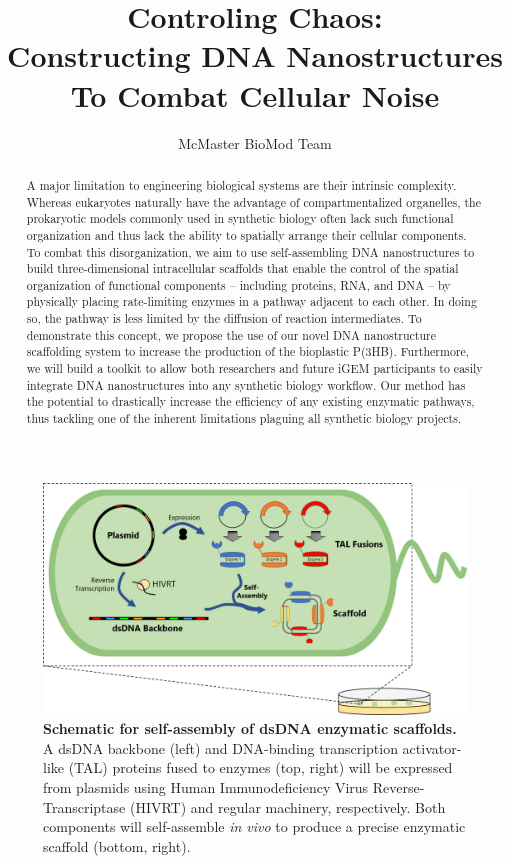 \documentclass[a4paper]{article}
\title{Controling Chaos: \\ Constructing DNA Nanostructures To Combat Cellular Noise}
\author{McMaster BioMod Team}
\date{}
\begin{document}
\maketitle
\thispagestyle{fancy}
\pagestyle{fancy}

\begin{figure}[H]
    \centering
    \includegraphics[width=0.9\linewidth]{graphicalAbstract.png}
    \caption{\textbf{Schematic for self-assembly of dsDNA enzymatic scaffolds.} A dsDNA backbone (left) and DNA-binding transcription activator-like (TAL) proteins fused to enzymes (top, right) will be expressed from plasmids using Human Immunodeficiency Virus Reverse-Transcriptase (HIVRT) and regular machinery, respectively. Both components will self-assemble \textit{in vivo} to produce a precise enzymatic scaffold (bottom, right).}
\end{figure}

\begin{abstract}
A major limitation to engineering biological systems are their intrinsic complexity.
Whereas eukaryotes naturally have the advantage of compartmentalized organelles, the prokaryotic models commonly used in synthetic biology often lack such functional organization and thus lack the ability to spatially arrange their cellular components.
To combat this disorganization, we aim to use self-assembling DNA nanostructures to build three-dimensional intracellular scaffolds that enable the control of the spatial organization of functional components – including proteins, RNA, and DNA – by physically placing rate-limiting enzymes in a pathway adjacent to each other\cite{intro1,intro2,intro3,intro4}.
In doing so, the pathway is less limited by the diffusion of reaction intermediates\cite{intro8,intro9}.
To demonstrate this concept, we propose the use of our novel DNA nanostructure scaffolding system to increase the production of the bioplastic P(3HB).
Furthermore, we will build a toolkit to allow both researchers and future iGEM participants to easily integrate DNA nanostructures into any synthetic biology workflow.
Our method has the potential to  drastically increase the efficiency of any existing enzymatic pathways, thus tackling one of the inherent limitations plaguing all synthetic biology projects.
\end{abstract}
\end{document}
